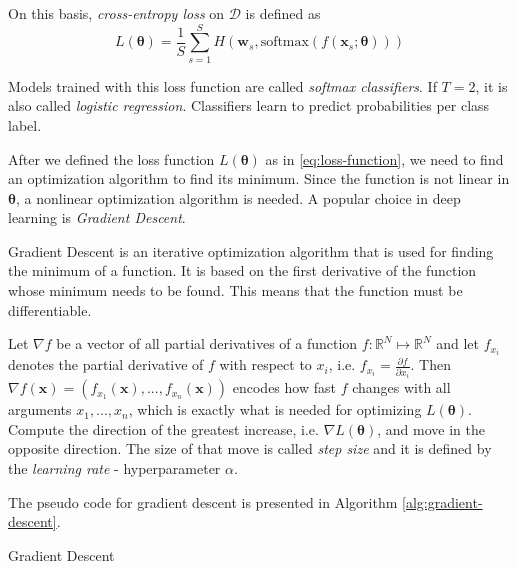 On this basis, \textit{cross-entropy loss} on $\mathcal{D}$ is defined as
\begin{equation} \label{eq:loss-function}
L(\pmb \theta) = \frac{1}{S} \sum_{s=1}^{S} H (\pmb w_s, \text{softmax} (f(\pmb x_s ; \pmb \theta)))
\end{equation}

Models trained with this loss function are called \textit{softmax classifiers}. If $T = 2$, it is also called \textit{logistic regression}. Classifiers learn to predict probabilities per class label.

After we defined the loss function $L(\pmb \theta)$  as in \ref{eq:loss-function}, we need to find an optimization algorithm to find its minimum. Since the function is not linear in $\pmb \theta$, a nonlinear optimization algorithm is needed. A popular choice in deep learning is \textit{Gradient Descent}.

Gradient Descent is an iterative optimization algorithm that is used for finding the minimum of a function. It is based on the first derivative of the function whose minimum needs to be found. This means that the function must be differentiable. 

Let $\nabla f$ be a vector of all partial derivatives of a function $f: \mathbb{R}^N \mapsto \mathbb{R}^N$ and let $f_{x_i}$ denotes the partial derivative of $f$ with respect to $x_i$, i.e. $f_{x_i} = \frac{\partial f}{\partial x_i}$. Then $\nabla f(\pmb x) = (f_{x_1}(\pmb x), ..., f_{x_n}(\pmb x))$  encodes how fast $f$ changes with all arguments $x_1, ..., x_n$, which is exactly what is needed for optimizing $L(\pmb \theta)$. Compute the direction of the greatest increase, i.e. $\nabla L(\pmb \theta)$, and move in the opposite direction. The size of that move is called \textit{step size} and it is defined by the \textit{learning rate} - hyperparameter $\alpha$.  

The pseudo code for gradient descent is presented in Algorithm \ref{alg:gradient-descent}.

\begin{algorithm}[htb]
\caption{Gradient Descent}
\label{alg:gradient-descent}


\end{algorithm}


